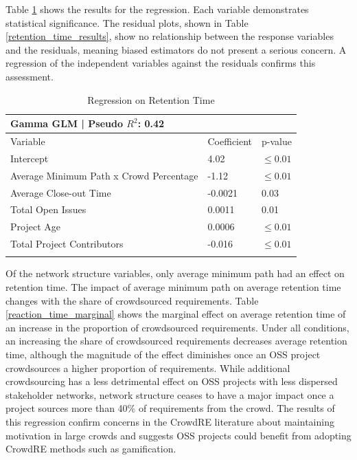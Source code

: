 Table \ref{retention_regression} shows the results for the regression. Each variable demonstrates statistical significance. The residual plots, shown in Table \ref{retention_time_results}, show no relationship between the response variables and the residuals, meaning biased estimators do not present a serious concern. A regression of the independent variables against the residuals confirms this assessment.

\begin{table}
\caption{Regression on Retention Time}
\label{retention_regression}
\begin{tabular}{lll}
Gamma GLM | Pseudo $R^2$: 0.42 \\
\hline\noalign{\smallskip}
Variable & Coefficient & p-value  \\
\noalign{\smallskip}\hline\noalign{\smallskip}
Intercept &  4.02 & $\leq 0.01$ \\
Average Minimum Path x Crowd Percentage &  -1.12 & $\leq 0.01$ \\
Average Close-out Time &  -0.0021 &  0.03  \\
Total Open Issues &  0.0011 &  0.01    \\
Project Age &  0.0006 &  $\leq 0.01$    \\
Total Project Contributors &  -0.016 &  $\leq 0.01$ \\
\noalign{\smallskip}\hline
\end{tabular}
\end{table}

Of the network structure variables, only average minimum path had an effect on retention time. The impact of average minimum path on average retention time changes with the share of crowdsourced requirements. Table \ref{reaction_time_marginal} shows the marginal effect on average retention time of an increase in the proportion of crowdsourced requirements. Under all conditions, an increasing the share of crowdsourced requirements decreases average retention time, although the magnitude of the effect diminishes once an OSS project crowdsources a higher proportion of requirements. While additional crowdsourcing has a less detrimental effect on OSS projects with less dispersed stakeholder networks, network structure ceases to have a major impact once a project sources more than 40\% of requirements from the crowd. The results of this regression confirm concerns in the CrowdRE literature \cite{glinz, groen, levy} about maintaining motivation in large crowds and suggests OSS projects could benefit from adopting CrowdRE methods such as gamification. 

